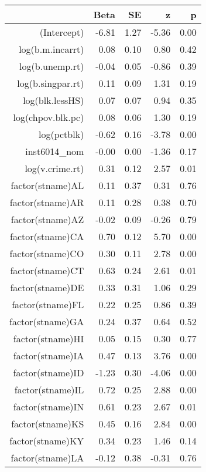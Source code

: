 \begin{table}[ht]
\centering
\begin{tabular}{rrrrr}
  \hline
 & Beta & SE & z & p \\ 
  \hline
(Intercept) & -6.81 & 1.27 & -5.36 & 0.00 \\ 
  log(b.m.incarrt) & 0.08 & 0.10 & 0.80 & 0.42 \\ 
  log(b.unemp.rt) & -0.04 & 0.05 & -0.86 & 0.39 \\ 
  log(b.singpar.rt) & 0.11 & 0.09 & 1.31 & 0.19 \\ 
  log(blk.lessHS) & 0.07 & 0.07 & 0.94 & 0.35 \\ 
  log(chpov.blk.pc) & 0.08 & 0.06 & 1.30 & 0.19 \\ 
  log(pctblk) & -0.62 & 0.16 & -3.78 & 0.00 \\ 
  inst6014\_nom & -0.00 & 0.00 & -1.36 & 0.17 \\ 
  log(v.crime.rt) & 0.31 & 0.12 & 2.57 & 0.01 \\ 
  factor(stname)AL & 0.11 & 0.37 & 0.31 & 0.76 \\ 
  factor(stname)AR & 0.11 & 0.28 & 0.38 & 0.70 \\ 
  factor(stname)AZ & -0.02 & 0.09 & -0.26 & 0.79 \\ 
  factor(stname)CA & 0.70 & 0.12 & 5.70 & 0.00 \\ 
  factor(stname)CO & 0.30 & 0.11 & 2.78 & 0.00 \\ 
  factor(stname)CT & 0.63 & 0.24 & 2.61 & 0.01 \\ 
  factor(stname)DE & 0.33 & 0.31 & 1.06 & 0.29 \\ 
  factor(stname)FL & 0.22 & 0.25 & 0.86 & 0.39 \\ 
  factor(stname)GA & 0.24 & 0.37 & 0.64 & 0.52 \\ 
  factor(stname)HI & 0.05 & 0.15 & 0.30 & 0.77 \\ 
  factor(stname)IA & 0.47 & 0.13 & 3.76 & 0.00 \\ 
  factor(stname)ID & -1.23 & 0.30 & -4.06 & 0.00 \\ 
  factor(stname)IL & 0.72 & 0.25 & 2.88 & 0.00 \\ 
  factor(stname)IN & 0.61 & 0.23 & 2.67 & 0.01 \\ 
  factor(stname)KS & 0.45 & 0.16 & 2.84 & 0.00 \\ 
  factor(stname)KY & 0.34 & 0.23 & 1.46 & 0.14 \\ 
  factor(stname)LA & -0.12 & 0.38 & -0.31 & 0.76 \\ 

\end{tabular}
\end{table}
